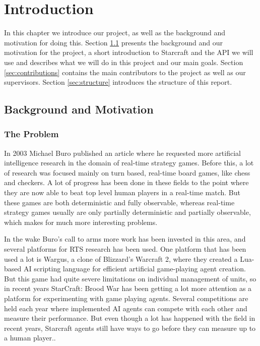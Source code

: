 
\chapter{Introduction}
In this chapter we introduce our project, as well as the background and motivation for doing this. Section \ref{sec:background} presents the background and our motivation for the project, a short introduction to Starcraft and the API we will use and describes what we will do in this project and our main goals. Section \ref{sec:contributions} contains the main contributors to the project as well as our supervisors. Section \ref{sec:structure} introduces the structure of this report.
\section{Background and Motivation}
\label{sec:background}
\subsection{The Problem}
In 2003 Michael Buro published an article where he requested more artificial
intelligence research in the domain of real-time strategy
games.\cite{buro2003real} Before this, a lot of research was focused mainly on
turn based, real-time board games, like chess and checkers. A lot of
progress has been done in these fields to the point where they are now able to
beat top level human players in a real-time match. \cite{campbell2002deep} But
these games are both deterministic and fully observable, whereas real-time
strategy games usually are only partially deterministic and partially
observable, which makes for much more interesting problems.

In the wake Buro's call to arms more work has been invested in this area, and
several platforms for RTS research has been used. One platform that has been
used a lot is Wargus\cite{wargus}, a clone of Blizzard's Warcraft 2, where they
created a Lua-based AI scripting language for efficient artificial game-playing
agent creation. But this game had quite severe limitations on individual
management of units, so in recent years StarCraft: Brood War has been getting a
lot more attention as a platform for experimenting with game playing agents.
Several competitions are held each year where implemented AI agents can
compete with each other and measure their performance. But even though a lot has
happened with the field in recent years, Starcraft agents still have ways to go
before they can measure up to a human player.\cite{eisbotvsfong}.

